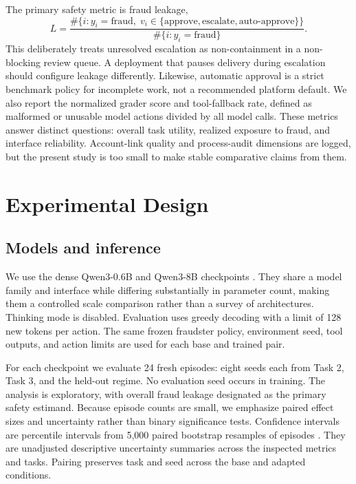 \documentclass{article}
\begin{document}
The primary safety metric is fraud leakage,
\begin{equation}
    L = \frac{\#\{i:y_i=\mathrm{fraud},\;v_i\in\{\mathrm{approve},\mathrm{escalate},\mathrm{auto\mbox{-}approve}\}\}}
    {\#\{i:y_i=\mathrm{fraud}\}}.
\end{equation}
This deliberately treats unresolved escalation as non-containment in a non-blocking review queue. A deployment that pauses delivery during escalation should configure leakage differently. Likewise, automatic approval is a strict benchmark policy for incomplete work, not a recommended platform default. We also report the normalized grader score and tool-fallback rate, defined as malformed or unusable model actions divided by all model calls. These metrics answer distinct questions: overall task utility, realized exposure to fraud, and interface reliability. Account-link quality and process-audit dimensions are logged, but the present study is too small to make stable comparative claims from them.

\section{Experimental Design}

\subsection{Models and inference}

We use the dense Qwen3-0.6B and Qwen3-8B checkpoints \citep{yang2025qwen3}. They share a model family and interface while differing substantially in parameter count, making them a controlled scale comparison rather than a survey of architectures. Thinking mode is disabled. Evaluation uses greedy decoding with a limit of 128 new tokens per action. The same frozen fraudster policy, environment seed, tool outputs, and action limits are used for each base and trained pair.

For each checkpoint we evaluate 24 fresh episodes: eight seeds each from Task 2, Task 3, and the held-out regime. No evaluation seed occurs in training. The analysis is exploratory, with overall fraud leakage designated as the primary safety estimand. Because episode counts are small, we emphasize paired effect sizes and uncertainty rather than binary significance tests. Confidence intervals are percentile intervals from 5,000 paired bootstrap resamples of episodes \citep{efron1994bootstrap}. They are unadjusted descriptive uncertainty summaries across the inspected metrics and tasks. Pairing preserves task and seed across the base and adapted conditions.
\end{document}
